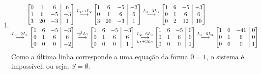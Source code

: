 \documentclass[12pt,a4paper]{article}
\makeatletter
\newenvironment{amatrix}[1]{%
  \left[\begin{array}{@{}*{#1}{c}|c@{}}
}{%
  \end{array}\right]
}
\newcommand{\grstep}[2][\relax]{%
   \ensuremath{\mathrel{
       {\mathop{\longrightarrow}\limits^{#2\mathstrut}_{
                                     \begin{subarray}{l} #1 \end{subarray}}}}}}
\makeatother
\begin{document}
\begin{enumerate}
\begin{enumerate}
\item
\begin{align*}
\begin{amatrix}{3}
 0 &  1 &  6 &  6 \\
 1 &  6 & -5 & -3 \\
 3 & 20 & -3 &  1
\end{amatrix}
&
\grstep{ L_1 \leftrightarrow L_2 }
\begin{amatrix}{3}
 1 &  6 & -5 & -3 \\
 0 &  1 &  6 &  6 \\
 3 & 20 & -3 &  1
\end{amatrix}
\grstep{ L_3 - 3 L_1 }
\begin{amatrix}{3}
 1 & 6 & -5 & -3 \\
 0 & 1 &  6 &  6 \\
 0 & 2 & 12 & 10
\end{amatrix} \\
\grstep{ L_3 - 2 L_1 }
\begin{amatrix}{3}
 1 & 6 & -5 & -3 \\
 0 & 1 &  6 &  6 \\
 0 & 0 &  0 & -2
\end{amatrix}
&
\grstep{ \frac{-1}{2} L_3 }
\begin{amatrix}{3}
 1 & 6 & -5 & -3 \\
 0 & 1 &  6 &  6 \\
 0 & 0 &  0 & 1
\end{amatrix}
\grstep[ L_1 + 3 L_3 ]{ L_2 - 6 L_3 }
\begin{amatrix}{3}
 1 & 6 & -5 & 0 \\
 0 & 1 &  6 & 0 \\
 0 & 0 &  0 & 1
\end{amatrix}
\grstep{ L_1 - 6 L_2 }
\begin{amatrix}{3}
 1 & 0 & -41 & 0 \\
 0 & 1 &  6 & 0 \\
 0 & 0 &  0 & 1
\end{amatrix}
\end{align*}
Como a última linha corresponde a uma equação da forma $0 = 1$, o sistema é impossível, ou seja, $S = \emptyset$.

\end{enumerate}


\end{enumerate}
\end{document}
